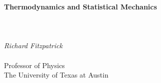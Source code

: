 \documentclass[12pt]{rfbook}
\begin{document}
\pagestyle{fancy}
\renewcommand{\chaptermark}[1]{
\markboth{#1}{}}
\fancyhf{}
\fancyhead[LO,RE]{\sl \leftmark}
\fancyhead[LE,RO]{\sl \thepage}

\thispagestyle{empty}
\begin{center}
{\Huge\bf Thermodynamics and Statistical Mechanics}\\[1ex]
~\\
~\\
~\\
{\Large\em  Richard Fitzpatrick}\\[1.5ex]~\\[1.5ex]
{\Large\sf  Professor  of Physics}\\[1.5ex]
{\Large\sf  The University of Texas at Austin}\\[10ex]
\end{center}

\tableofcontents









\end{document}

